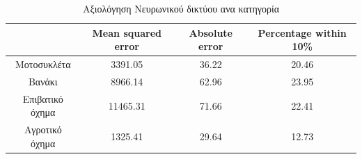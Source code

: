\documentclass{llncs}
\begin{document}
\begin{table}
    \centering
    \begin{tabular}{|c|c|c|c|} %
        \hline
         &Mean squared error & Absolute error & Percentage within 10\% \\ %
        \hline
        Μοτοσυκλέτα & 3391.05 & 36.22 & 20.46 \\
        Βανάκι & 8966.14 & 62.96 & 23.95 \\
        Επιβατικό όχημα & 11465.31 & 71.66 & 22.41 \\
        Αγροτικό όχημα & 1325.41 & 29.64 & 12.73 \\
        \hline
    \end{tabular}
    \caption{Αξιολόγηση Νευρωνικού δικτύου ανα κατηγορία}
    \label{tab:neural_network_cat_individual}
\end{table}
\end{document}
